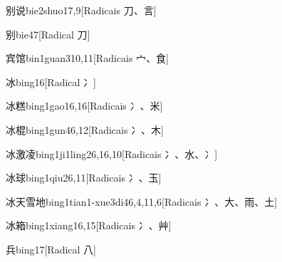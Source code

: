\begin{entry}{别说}{bie2shuo1}{7,9}[Radicais ⼑、⾔]
\end{entry}

\begin{entry}{别}{bie4}{7}[Radical ⼑]
\end{entry}

\begin{entry}{宾馆}{bin1guan3}{10,11}[Radicais ⼧、⾷]
\end{entry}

\begin{entry}{冰}{bing1}{6}[Radical ⼎]
\end{entry}

\begin{entry}{冰糕}{bing1gao1}{6,16}[Radicais ⼎、⽶]
\end{entry}

\begin{entry}{冰棍}{bing1gun4}{6,12}[Radicais ⼎、⽊]
\end{entry}

\begin{entry}{冰激凌}{bing1ji1ling2}{6,16,10}[Radicais ⼎、⽔、⼎]
\end{entry}

\begin{entry}{冰球}{bing1qiu2}{6,11}[Radicais ⼎、⽟]
\end{entry}

\begin{entry}{冰天雪地}{bing1tian1-xue3di4}{6,4,11,6}[Radicais ⼎、⼤、⾬、⼟]
\end{entry}

\begin{entry}{冰箱}{bing1xiang1}{6,15}[Radicais ⼎、⾋]
\end{entry}

\begin{entry}{兵}{bing1}{7}[Radical ⼋]
\end{entry}


